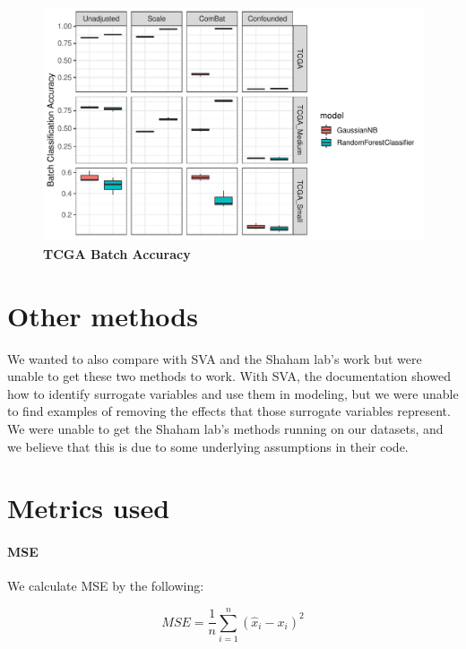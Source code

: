 \documentclass{article}
\begin{document}
\begin{figure}
	\centering
	\includegraphics[width=\columnwidth]{figures/supplement/tcga_batch_accuracy.pdf}
	\caption{\textbf{TCGA Batch Accuracy}
	}
	\label{fig:batch}
\end{figure}

\section{Other methods}

We wanted to also compare with SVA \cite{leek_capturing_2007} and the Shaham lab's work \cite{shaham_removal_2017,shaham_batch_2018} but were unable to get these two methods to work.
With SVA, the documentation showed how to identify surrogate variables and use them in modeling, but we were unable to find examples of removing the effects that those surrogate variables represent.
We were unable to get the Shaham lab's methods running on our datasets, and we believe that this is due to some underlying assumptions in their code.

\section{Metrics used}

\paragraph{MSE}

We calculate MSE by the following:

\begin{equation}
	\label{mse}
	MSE = \frac{1}{n}\sum_{i=1}^n{(\hat{x}_i - x_i)^2}
\end{equation}
\end{document}
